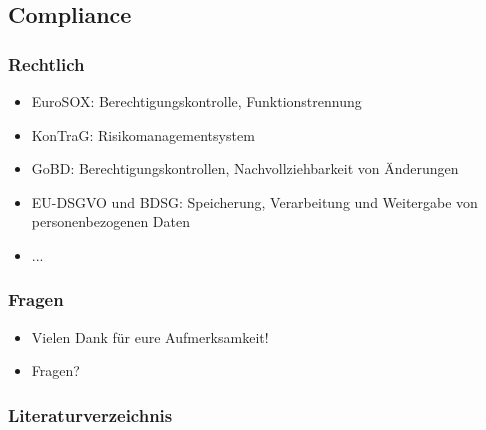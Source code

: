 \documentclass[11pt]{beamer}
\begin{document}
\subsection{Compliance}
\begin{frame}
  \frametitle{Rechtlich}
  \begin{itemize}
    \item EuroSOX: Berechtigungskontrolle, Funktionstrennung
    \item KonTraG: Risikomanagementsystem
    \item GoBD: Berechtigungskontrollen, Nachvollziehbarkeit von Änderungen
    \item EU-DSGVO und BDSG: Speicherung, Verarbeitung und Weitergabe von personenbezogenen Daten
    \item ...
  \end{itemize}
\end{frame}

\begin{frame}
  \frametitle{Fragen}
  \begin{itemize}
    \item Vielen Dank für eure Aufmerksamkeit!
    \item Fragen?
  \end{itemize}
\end{frame}

\begin{frame}[allowframebreaks]
  \frametitle{Literaturverzeichnis}
  \printbibliography
\end{frame}
\end{document}
